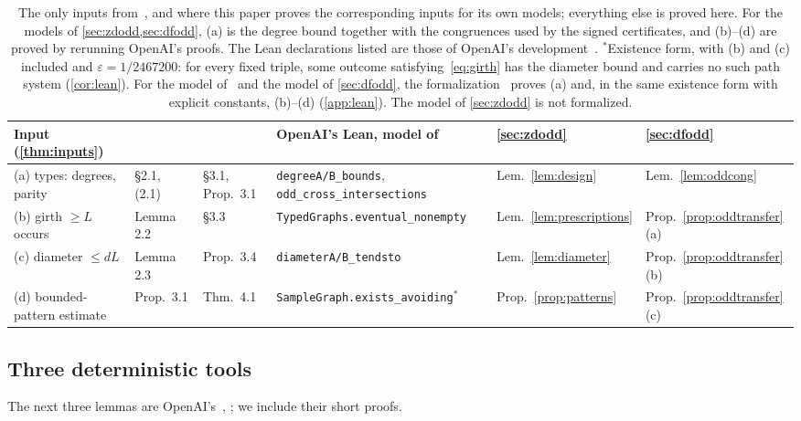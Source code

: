 \documentclass[11pt]{article}
\theoremstyle{definition}
\theoremstyle{plain}
\newcommand{\eps}{\varepsilon}
\newcommand{\lean}[1]{\texttt{\small #1}}
\begin{document}
\begin{table}[!tb]
\centering\footnotesize\setlength{\tabcolsep}{3.5pt}
\begin{tabular}{@{}lllp{3.6cm}ll@{}}
\toprule
Input (\cref{thm:inputs}) & \cite{OAI196} & \cite{OAI197a} & OpenAI's Lean, model of~\cite{OAI196} & \cref{sec:zdodd} & \cref{sec:dfodd} \\
\midrule
(a) types: degrees, parity & \S2.1, (2.1) & \S3.1, Prop.~3.1 & \lean{degreeA/B\_bounds}, \lean{odd\_cross\_inter\-sections} & Lem.~\ref{lem:design} & Lem.~\ref{lem:oddcong} \\
(b) girth $\ge L$ occurs & Lemma 2.2 & \S3.3 & \lean{TypedGraphs.}\allowbreak\lean{eventual\_nonempty} & Lem.~\ref{lem:prescriptions} & Prop.~\ref{prop:oddtransfer}(a) \\
(c) diameter $\le dL$ & Lemma 2.3 & Prop.~3.4 & \lean{diameterA/B\_tendsto} & Lem.~\ref{lem:diameter} & Prop.~\ref{prop:oddtransfer}(b) \\
(d) bounded-pattern estimate & Prop.~3.1 & Thm.~4.1 & \lean{SampleGraph.}\allowbreak\lean{exists\_avoiding}$^{*}$ & Prop.~\ref{prop:patterns} & Prop.~\ref{prop:oddtransfer}(c) \\
\bottomrule
\end{tabular}
\caption{The only inputs from~\cite{OAI196,OAI197a}, and where this paper proves the corresponding inputs for its own models; everything else is proved here. For the models of \cref{sec:zdodd,sec:dfodd}, (a) is the degree bound together with the congruences used by the signed certificates, and (b)--(d) are proved by rerunning OpenAI's proofs. The Lean declarations listed are those of OpenAI's development~\cite{OAIlean}. ${}^{*}$Existence form, with (b) and (c) included and $\eps=1/2467200$: for every fixed triple, some outcome satisfying~\eqref{eq:girth} has the diameter bound and carries no such path system (\cref{cor:lean}). For the model of~\cite{OAI197a} and the model of \cref{sec:dfodd}, the formalization~\cite{MghirbiLean} proves (a) and, in the same existence form with explicit constants, (b)--(d) (\cref{app:lean}). The model of \cref{sec:zdodd} is not formalized.}
\label{tab:dictionary}
\end{table}



\subsection{Three deterministic tools}
The next three lemmas are OpenAI's~\cite[Lemmas~4.2--4.4]{OAI196}, \cite[Lemmas~5.3--5.5]{OAI197a}; we include their short proofs.
\end{document}
